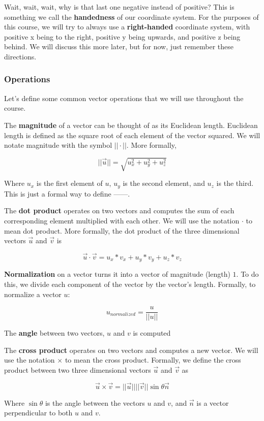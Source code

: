 \documentclass[a4paper]{article}
\begin{document}
Wait, wait, wait, why is that last one negative instead of positive? This is something we call the \textbf{handedness} of our coordinate system. For the purposes of this course, we will try to always use a \textbf{right-handed} coordinate system, with positive x being to the right, positive y being upwards, and positive z being behind. We will discuss this more later, but for now, just remember these directions.

\subsubsection{Operations}

Let's define some common vector operations that we will use throughout the course.

The \textbf{magnitude} of a vector can be thought of as its Euclidean length. Euclidean length is defined as the square root of each element of the vector squared. We will notate magnitude with the symbol $||\cdot||$. More formally, 

\[||\vec u|| = \sqrt{u_x^2 + u_y^2 + u_z^2}\]

Where $u_x$ is the first element of $u$, $u_y$ is the second element, and $u_z$ is the third. This is just a formal way to define ------.

The \textbf{dot product} operates on two vectors and computes the sum of each corresponding element multiplied with each other. We will use the notation $\cdot$ to mean dot product. More formally, the dot product of the three dimensional vectors $\vec u$ and $\vec v$ is 

\[\vec u \cdot \vec v = u_x * v_x + u_y * v_y + u_z * v_z \]

\textbf{Normalization} on a vector turns it into a vector of magnitude (length) $1$. To do this, we divide each component of the vector by the vector's length. Formally, to normalize a vector $u$:

\[u_{normalized} = \frac{u}{||u||}\]

The \textbf{angle} between two vectors, $u$ and $v$ is computed  

The \textbf{cross product} operates on two vectors and computes a new vector. We will use the notation $\times$ to mean the cross product. Formally, we define the cross product between two three dimensional vectors $\vec u$ and $\vec v$ as

\[\vec u \times \vec v = ||\vec u|| ||\vec v|| \sin \theta \vec n\]

Where $\sin \theta$ is the angle between the vectors $u$ and $v$, and $\vec n$ is a vector perpendicular to both $u$ and $v$.





\end{document}
